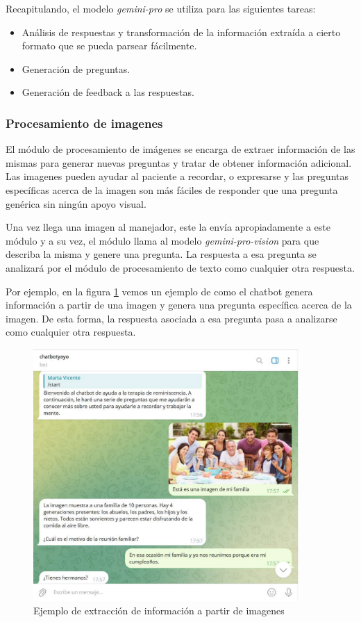 Recapitulando, el modelo \textit{gemini-pro} se utiliza para las siguientes tareas: 
\begin{itemize}
	\item Análisis de respuestas y transformación de la información extraída a cierto formato que se pueda parsear fácilmente.
	\item Generación de preguntas.
	\item Generación de feedback a las respuestas.
\end{itemize}

\subsubsection{Procesamiento de imagenes}
\label{procesamientoimagenes}
El módulo de procesamiento de imágenes se encarga de extraer información de las mismas para generar nuevas preguntas y tratar de obtener información adicional. Las imagenes pueden ayudar al paciente a recordar, o expresarse y las preguntas específicas acerca de la imagen son más fáciles de responder que una pregunta genérica sin ningún apoyo visual. 

Una vez llega una imagen al manejador, este la envía apropiadamente a este módulo y a su vez, el módulo llama al modelo  \textit{gemini-pro-vision} para que describa la misma y genere una pregunta. La respuesta a esa pregunta se analizará por el módulo de procesamiento de texto como cualquier otra respuesta. 

Por ejemplo, en la figura \ref{fig:imagenFamilia} vemos un ejemplo de como el chatbot genera información a partir de una imagen y genera una pregunta específica acerca de la imagen. De esta forma, la respuesta asociada a esa pregunta pasa a analizarse como cualquier otra respuesta. 

\begin{figure}[h]
	\centering
	\includegraphics[width=0.9\textwidth]{Imagenes/extracInfoImag}
	\caption{Ejemplo de extracción de información a partir de imagenes}
	\label{fig:imagenFamilia}
\end{figure}


